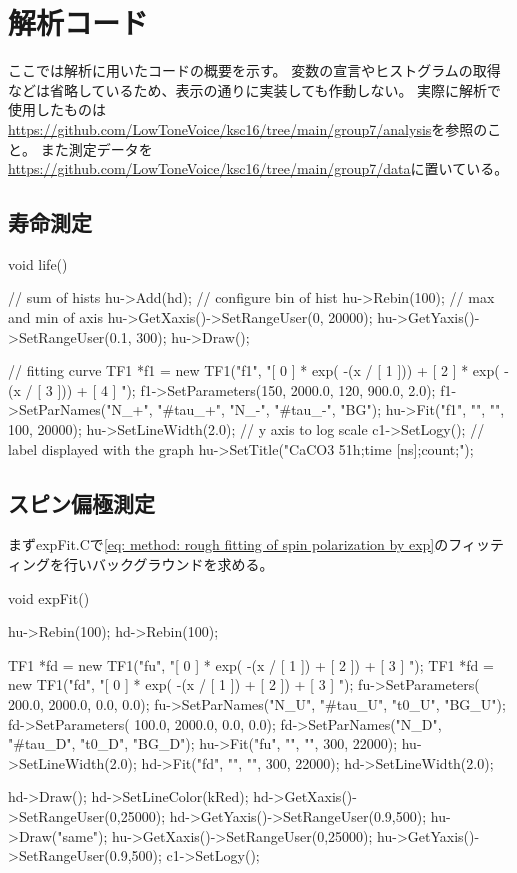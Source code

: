 \documentclass[dvipdfmx]{jsarticle}
\begin{document}
\section{解析コード}

ここでは解析に用いたコードの概要を示す。
変数の宣言やヒストグラムの取得などは省略しているため、表示の通りに実装しても作動しない。
実際に解析で使用したものは\url{https://github.com/LowToneVoice/ksc16/tree/main/group7/analysis}を参照のこと。
また測定データを\url{https://github.com/LowToneVoice/ksc16/tree/main/group7/data}に置いている。

\subsection{寿命測定}

\begin{mylisting}[language=c++, caption=life.C]
void life()
{
    // sum of hists
    hu->Add(hd);
    // configure bin of hist
    hu->Rebin(100);
    // max and min of axis
    hu->GetXaxis()->SetRangeUser(0, 20000);
    hu->GetYaxis()->SetRangeUser(0.1, 300);
    hu->Draw();

    // fitting curve
    TF1 *f1 = new TF1("f1", "[ 0 ] * exp( -(x / [ 1 ])) + [ 2 ] * exp( -(x / [ 3 ])) +  [ 4 ] ");
    f1->SetParameters(150, 2000.0, 120, 900.0, 2.0);
    f1->SetParNames("N_{+}", "#tau_{+}", "N_{-}", "#tau_{-}", "BG");
    hu->Fit("f1", "", "", 100, 20000);
    hu->SetLineWidth(2.0);
    // y axis to log scale
    c1->SetLogy();
    // label displayed with the graph
    hu->SetTitle("CaCO3 51h;time [ns];count;");
}
\end{mylisting}

\subsection{スピン偏極測定}
まずexpFit.Cで\eqref{eq: method: rough fitting of spin polarization by exp}のフィッティングを行いバックグラウンドを求める。

\begin{mylisting}[language=c++,caption=expFit.C]
void expFit()
{
    hu->Rebin(100);
    hd->Rebin(100);

    TF1 *fd = new TF1("fu", "[ 0 ] * exp( -(x / [ 1 ]) + [ 2 ]) +  [ 3 ] ");
    TF1 *fd = new TF1("fd", "[ 0 ] * exp( -(x / [ 1 ]) + [ 2 ]) +  [ 3 ] ");
    fu->SetParameters( 200.0, 2000.0, 0.0, 0.0);
    fu->SetParNames("N_U", "#tau_U", "t0_U", "BG_U");
    fd->SetParameters( 100.0, 2000.0, 0.0, 0.0);
    fd->SetParNames("N_D", "#tau_D", "t0_D", "BG_D");
    hu->Fit("fu", "", "", 300, 22000);
    hu->SetLineWidth(2.0);
    hd->Fit("fd", "", "", 300, 22000);
    hd->SetLineWidth(2.0);

    hd->Draw();
    hd->SetLineColor(kRed);
    hd->GetXaxis()->SetRangeUser(0,25000);
    hd->GetYaxis()->SetRangeUser(0.9,500);
    hu->Draw("same");
    hu->GetXaxis()->SetRangeUser(0,25000);
    hu->GetYaxis()->SetRangeUser(0.9,500);
    c1->SetLogy();
}
\end{mylisting}
\end{document}
